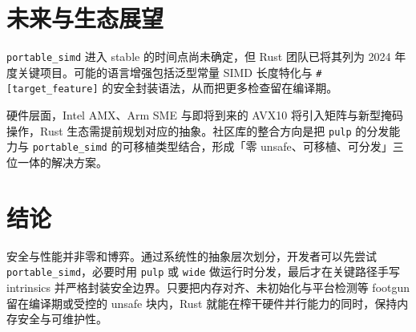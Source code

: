\chapter{未来与生态展望}
\texttt{portable\_{}simd} 进入 stable 的时间点尚未确定，但 Rust 团队已将其列为 2024 年度关键项目。可能的语言增强包括泛型常量 SIMD 长度特化与 \texttt{\#{}[target\_{}feature]} 的安全封装语法，从而把更多检查留在编译期。\par
硬件层面，Intel AMX、Arm SME 与即将到来的 AVX10 将引入矩阵与新型掩码操作，Rust 生态需提前规划对应的抽象。社区库的整合方向是把 \texttt{pulp} 的分发能力与 \texttt{portable\_{}simd} 的可移植类型结合，形成「零 unsafe、可移植、可分发」三位一体的解决方案。\par
\chapter{结论}
安全与性能并非零和博弈。通过系统性的抽象层次划分，开发者可以先尝试 \texttt{portable\_{}simd}，必要时用 \texttt{pulp} 或 \texttt{wide} 做运行时分发，最后才在关键路径手写 intrinsics 并严格封装安全边界。只要把内存对齐、未初始化与平台检测等 footgun 留在编译期或受控的 unsafe 块内，Rust 就能在榨干硬件并行能力的同时，保持内存安全与可维护性。\par
